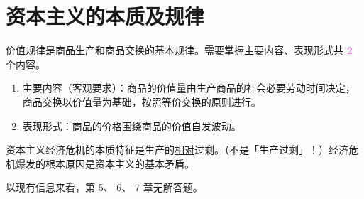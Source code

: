 \documentclass[UTF8]{ctexart}
\newcommand\Concept[1]{\colorbox{cyan!10!white}{\textcolor{cyan!40!black}{#1}}}
\newcommand\Emph[1]{\colorbox{violet!10}{\textcolor{violet}{\bfseries #1}}}
\newcommand\Example[1]{\textcolor{cyan!70!black}{\small #1}}
\newcommand\pos[1]{\hspace{0pt} \marginpar{\footnotesize\textcolor{yellow!50!black}{\hfill #1}}}
\begin{document}
\section{资本主义的本质及规律}
\begin{description}[itemsep=0pt]
    \item[\Concept{价值规律}] \pos{p189} 价值规律是商品生产和商品交换的基本规律。需要掌握主要内容、表现形式共 \Emph{2} 个内容。
    \Example{\begin{enumerate}[itemsep=0pt, parsep=0pt, leftmargin=15pt]
                \item 主要内容（客观要求）：商品的价值量由生产商品的社会必要劳动时间决定，商品交换以价值量为基础，按照等价交换的原则进行。
                \item 表现形式：商品的价格围绕商品的价值自发波动。
            \end{enumerate}}

    \item[\Concept{资本主义经济危机}] \pos{p223} 资本主义经济危机的本质特征是生产的\uline{相对}过剩。（不是「生产过剩」！）经济危机爆发的根本原因是资本主义的基本矛盾。
\end{description}

以现有信息来看，第 5、 6、 7 章无解答题。
\end{document}
